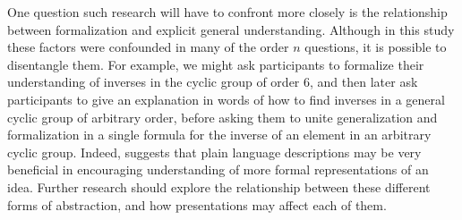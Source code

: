 \documentclass[man,10pt]{apa6}
\begin{document}
One question such research will have to confront more closely is the relationship between formalization and explicit general understanding. Although in this study these factors were confounded in many of the order $n$ questions, it is possible to disentangle them. For example, we might ask participants to formalize their understanding of inverses in the cyclic group of order 6, and then later ask participants to give an explanation in words of how to find inverses in a general cyclic group of arbitrary order, before asking them to unite generalization and formalization in a single formula for the inverse of an element in an arbitrary cyclic group. Indeed,  suggests that plain language descriptions may be very beneficial in encouraging understanding of more formal representations of an idea. Further research should explore the relationship between these different forms of abstraction, and how presentations may affect each of them.
\end{document}
